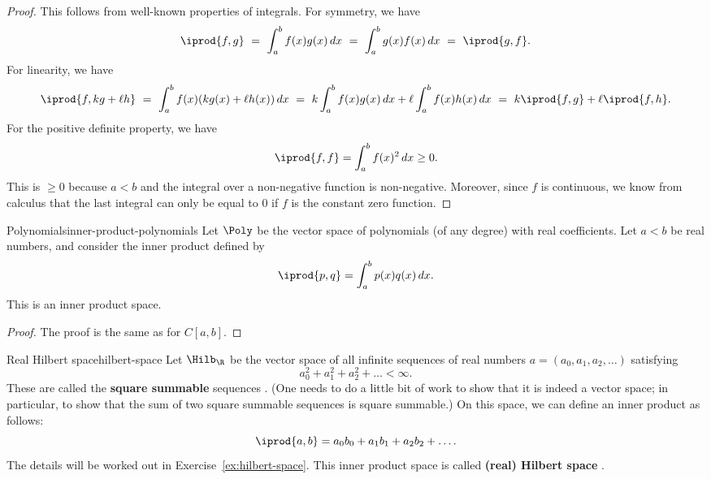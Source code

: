 \begin{proof}
  This follows from well-known properties of integrals. For symmetry,
  we have
  \begin{equation*}
    \iprod{f,g}
    ~=~ \int_{a}^{b} f(x)g(x)\,dx
    ~=~ \int_{a}^{b} g(x)f(x)\,dx
    ~=~ \iprod{g,f}.
  \end{equation*}
  For linearity, we have
  \begin{equation*}
    \iprod{f,kg+\ell h}
    ~=~ \int_{a}^{b} f(x)(kg(x)+\ell h(x))\,dx
    ~=~ k\int_{a}^{b} f(x)g(x)\,dx+\ell\int_{a}^{b} f(x)h(x)\,dx
    ~=~ k\iprod{f,g}+\ell\iprod{f,h}.
  \end{equation*}
  For the positive definite property, we have
  \begin{equation*}
    \iprod{f,f}
    = \int_{a}^{b} f(x)^2\,dx
    \geq 0.
  \end{equation*}
  This is $\geq 0$ because $a<b$ and the integral over a non-negative
  function is non-negative. Moreover, since $f$ is continuous, we know
  from calculus that the last integral can only be equal to $0$ if $f$
  is the constant zero function.
\end{proof}

\begin{example}{Polynomials}{inner-product-polynomials}
  Let $\Poly$ be the vector space of polynomials (of any degree) with
  real coefficients. Let $a<b$ be real numbers, and consider the inner
  product defined by
  \begin{equation*}
    \iprod{p,q} = \int_{a}^{b} p(x)q(x)\,dx.
  \end{equation*}
  This is an inner product space.%
\end{example}

\begin{proof}
  The proof is the same as for $C[a,b]$.
\end{proof}

\begin{example}{Real Hilbert space}{hilbert-space}
  Let $\Hilb_{\R}$ be the vector space of all infinite sequences of
  real numbers $a=(a_0,a_1,a_2,\ldots)$ satisfying
  \begin{equation*}
    a_0^2 + a_1^2 + a_2^2 + \ldots < \infty.
  \end{equation*}
  These are called the \textbf{square summable} sequences%
  . (One needs
  to do a little bit of work to show that it is indeed a vector space;
  in particular, to show that the sum of two square summable sequences
  is square summable.) On this space, we can
  define an inner product as follows:
  \begin{equation*}
    \iprod{a,b} = a_0b_0 + a_1b_1 + a_2b_2 + \ldots.
  \end{equation*}
  The details will be worked out in Exercise~\ref{ex:hilbert-space}.
  This inner product space is called \textbf{(real) Hilbert space}%
  .
\end{example}

